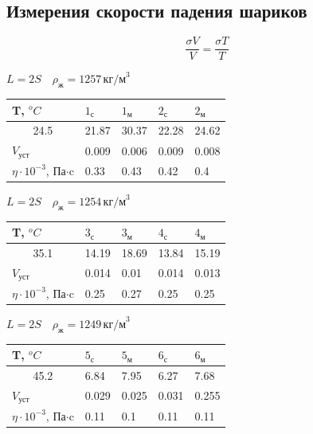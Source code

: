 \documentclass[a4paper,12pt]{article}
\begin{document}
		\subsection{Измерения скорости падения шариков}
		\[
		\frac{\sigma V}{V}=\frac{\sigma T}{T}
		\]
		\begin{center}
			$L = 2S \quad \rho_{\text{ж}} = 1257 \, \text{кг/м}^3$
			
			\begin{tabular}{l  l  l  l  l}
				T, $^oC$ & $1_{\text{с}}$ & $1_{\text{м}}$ & $2_{\text{с}}$ & $2_{\text{м}}$ \\ \hline
				\multicolumn{1}{|c|}{24.5} & 21.87  & 30.37 & 22.28 & 24.62 \\ \hline 
				$V_{\text{уст}}$ & 0.009 & 0.006 & 0.009 & 0.008 \\ \hline
				$\eta \cdot 10^{-3}$, Па$\cdot$c &  0.33 & 0.43 & 0.42 & 0.4 \\ \hline
			\end{tabular}
		\end{center}
		
		\begin{center}
			$L = 2S \quad \rho_{\text{ж}} = 1254 \, \text{кг/м}^3$
			
			\begin{tabular}{l  l  l  l  l}
				T, $^oC$ & $3_{\text{с}}$ & $3_{\text{м}}$ & $4_{\text{с}}$ & $4_{\text{м}}$ \\ \hline
				\multicolumn{1}{|c|}{35.1} & 14.19  & 18.69 & 13.84 & 15.19 \\ \hline
				$V_{\text{уст}}$ & 0.014 & 0.01 & 0.014 & 0.013 \\ \hline
				$\eta \cdot 10^{-3}$, Па$\cdot$c &  0.25 & 0.27 & 0.25 & 0.25 \\ \hline
			\end{tabular}
		\end{center}
		
		\begin{center}
			$L = 2S \quad \rho_{\text{ж}} = 1249 \, \text{кг/м}^3$
			
			\begin{tabular}{l  l  l  l  l}
				T, $^oC$ & $5_{\text{с}}$ & $5_{\text{м}}$ & $6_{\text{с}}$ & $6_{\text{м}}$ \\ \hline
				\multicolumn{1}{|c|}{45.2} & 6.84  & 7.95 & 6.27 & 7.68 \\ \hline
				$V_{\text{уст}}$ & 0.029 & 0.025 & 0.031 & 0.255 \\ \hline
				$\eta \cdot 10^{-3}$, Па$\cdot$c &  0.11 & 0.1 & 0.11 & 0.11 \\ \hline 
			\end{tabular}
		\end{center}
		
\end{document}
